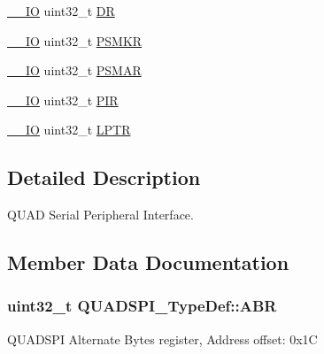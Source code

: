 \begin{DoxyCompactItemize}
\item 
\hyperlink{core__sc300_8h_aec43007d9998a0a0e01faede4133d6be}{\+\_\+\+\_\+\+IO} uint32\+\_\+t \hyperlink{struct_q_u_a_d_s_p_i___type_def_ae38590143dc85226183510790dda3475}{DR}
\item 
\hyperlink{core__sc300_8h_aec43007d9998a0a0e01faede4133d6be}{\+\_\+\+\_\+\+IO} uint32\+\_\+t \hyperlink{struct_q_u_a_d_s_p_i___type_def_a834e5dc7b51e2ab38570f6fcc6343b16}{P\+S\+M\+KR}
\item 
\hyperlink{core__sc300_8h_aec43007d9998a0a0e01faede4133d6be}{\+\_\+\+\_\+\+IO} uint32\+\_\+t \hyperlink{struct_q_u_a_d_s_p_i___type_def_a380877fcd114e30bba84898c139ca540}{P\+S\+M\+AR}
\item 
\hyperlink{core__sc300_8h_aec43007d9998a0a0e01faede4133d6be}{\+\_\+\+\_\+\+IO} uint32\+\_\+t \hyperlink{struct_q_u_a_d_s_p_i___type_def_a75e800640a43256743699e865edcea91}{P\+IR}
\item 
\hyperlink{core__sc300_8h_aec43007d9998a0a0e01faede4133d6be}{\+\_\+\+\_\+\+IO} uint32\+\_\+t \hyperlink{struct_q_u_a_d_s_p_i___type_def_aaa464abb172a98c828d889240bde0fc9}{L\+P\+TR}
\end{DoxyCompactItemize}


\subsection{Detailed Description}
Q\+U\+AD Serial Peripheral Interface. 

\subsection{Member Data Documentation}
\subsubsection[{\texorpdfstring{A\+BR}{ABR}}]{ uint32\+\_\+t Q\+U\+A\+D\+S\+P\+I\+\_\+\+Type\+Def\+::\+A\+BR}\hypertarget{struct_q_u_a_d_s_p_i___type_def_af989aa29f188fdda929cd5f350ff27c5}{}\label{struct_q_u_a_d_s_p_i___type_def_af989aa29f188fdda929cd5f350ff27c5}
Q\+U\+A\+D\+S\+PI Alternate Bytes register, Address offset\+: 0x1C 

